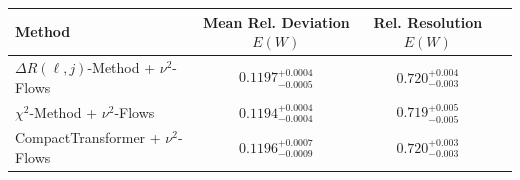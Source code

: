     \begin{tabular}{lccc}
        \toprule
        Method & Mean Rel. Deviation $E(W)$ & Rel. Resolution $E(W)$ \\
        \midrule
        $\Delta R(\ell,j)$-Method + $\nu^2$-Flows & $0.1197^{+0.0004}_{-0.0005}$ & $0.720^{+0.004}_{-0.003}$ \\
        $\chi^2$-Method + $\nu^2$-Flows & $0.1194^{+0.0004}_{-0.0004}$ & $0.719^{+0.005}_{-0.005}$ \\
        CompactTransformer + $\nu^2$-Flows & $0.1196^{+0.0007}_{-0.0009}$ & $0.720^{+0.003}_{-0.003}$ \\
        \bottomrule
    \end{tabular}